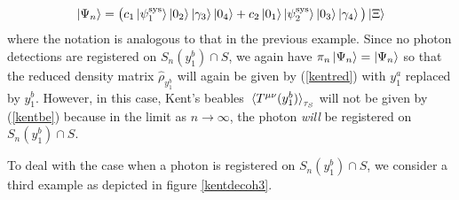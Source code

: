  \begin{equation*}
 \ket{\Psi_n}=\big(c_1\ket{\psi_1^\text{sys}}\ket{0_2}\ket{\gamma_3}\ket{0_4}+c_2\ket{0_1}\ket{\psi_2^\text{sys}}\ket{0_3}\ket{\gamma_4}\big)\ket*{\Xi}
 \end{equation*}
 where the notation is analogous to that in the previous example. Since no photon detections are registered on $S_n(y^b_1)\cap S$, we again have $\pi_n\ket{\Psi_n}=\ket{\Psi_n}$ so that the reduced density matrix $\hat{\rho}_{y_1^b}$ will again be given by  (\ref{kentred}) with $y^a_1$ replaced by $y^b_1$. However, in this case, Kent's beables $\ev*{T^{\mu\nu}(y^b_1)}_{\tau_S}$ will not be given by (\ref{kentbe}) because in the limit as $n\rightarrow\infty$, the photon \emph{will} be registered on $S_n(y^b_1)\cap S$. 
 
 To deal with the case when a photon is registered on $S_n(y^b_1)\cap S$, we consider a third example as depicted in figure \ref{kentdecoh3}.


